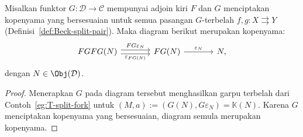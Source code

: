 \begin{lemma}\label{prop:Beck-FG-coeq}
	Misalkan funktor $G:\mathcal{D}\to\mathcal{C}$ mempunyai adjoin kiri $F$
	dan $G$ menciptakan kopenyama yang bersesuaian untuk semua pasangan
	$G$-terbelah $f,g:X\rightrightarrows Y$
	(Definisi~\ref{def:Beck-split-pair}). Maka diagram berikut merupakan
	kopenyama:
	\begin{equation*}\begin{tikzcd}[column sep=large]
		FGFG(N) \arrow[shift left, r, "FG\varepsilon_N"] \arrow[shift right, r, "\varepsilon_{FG(N)}"'] & FG(N) \arrow[r, "\varepsilon_N"] & N,
	\end{tikzcd}\end{equation*}
	dengan $N\in\Obj(\mathcal{D})$.
\end{lemma}
\begin{proof}
	Menerapkan $G$ pada diagram tersebut menghasilkan garpu terbelah dari
	Contoh~\ref{eg:T-split-fork} untuk
	$(M,a):=(G(N),G\varepsilon_N)=\mathbb{K}(N)$. Karena $G$ menciptakan
	kopenyama yang bersesuaian, diagram semula merupakan kopenyama.
\end{proof}

